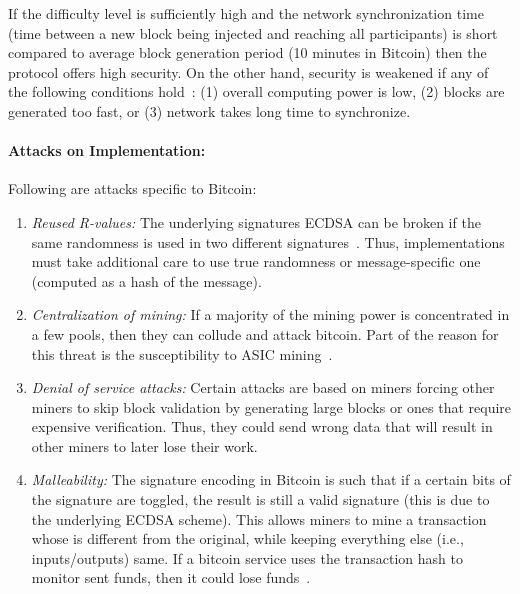 \documentclass[]{report}   %
\begin{document}
If the difficulty level is sufficiently high and the network synchronization time (time between a new block being injected and reaching all participants) is short compared to average block generation period (10 minutes in Bitcoin) then the protocol offers high security. On the other hand, security is weakened if any of the following conditions hold~\cite{Garay2015}:
(1) overall computing power is low, (2) blocks are generated too fast, or (3) network takes long time to synchronize. 

\paragraph{Attacks on Implementation:} Following are attacks specific to Bitcoin:
\begin{enumerate}
	\item {\em Reused R-values:} The underlying signatures ECDSA can be broken if the same randomness is used in two different signatures~\cite{cryptoeprint:2013:734}. Thus, implementations must take additional care to use true randomness or message-specific one (computed as a hash of the message).
	\item {\em Centralization of mining:} If a majority of the mining power is concentrated in a few pools, then they can collude and attack bitcoin. Part of the reason for this threat is the susceptibility to ASIC mining~\cite{Taylor:2013:BAB:2555729.2555745}.
	\item {\em Denial of service attacks:} Certain attacks are based on miners forcing other miners to skip block validation by generating large blocks or ones that require expensive verification. Thus, they could send wrong data that will result in other miners to later lose their work.
	\item {\em Malleability:} The signature encoding in Bitcoin is such that if a certain bits of the signature are toggled, the result is still a valid signature (this is due to the underlying ECDSA scheme). This allows miners to mine a transaction whose is different from the original, while keeping everything else (i.e., inputs/outputs) same. If a bitcoin service uses the transaction hash to monitor sent funds, then it could lose funds~\cite{decker2014bitcoin}.
\end{enumerate}
\end{document}
